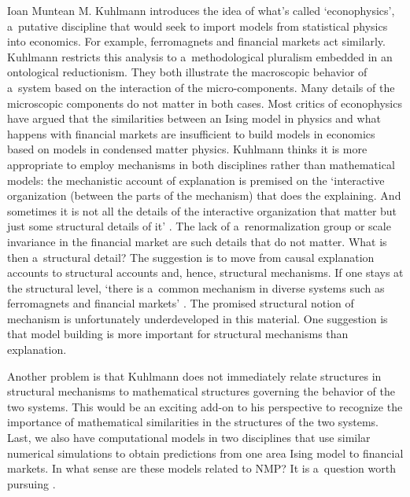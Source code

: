 \begin{recengenv}{Ioan Muntean}
\enlargethispage{1.5\baselineskip}
M. Kuhlmann introduces the idea of what's called ‘econophysics', a~putative discipline that would seek to import models from statistical physics into economics. For example, ferromagnets and financial markets act similarly. Kuhlmann restricts this analysis to a~methodological pluralism embedded in an ontological reductionism. They both illustrate the macroscopic behavior of a~system based on the interaction of the micro-components. Many details of the microscopic components do not matter in both cases. Most critics of econophysics have argued that the similarities between an Ising model in physics and what happens with financial markets are insufficient to build models in economics based on models in condensed matter physics. Kuhlmann thinks it is more appropriate to employ mechanisms in both disciplines rather than mathematical models: the mechanistic account of explanation is premised on the ‘interactive organization (between the parts of the mechanism) that does the explaining. And sometimes it is not all the details of the interactive organization that matter but just some structural details of it'
\parencite*[][p.195]{falkenburg_mechanistic_2019}. %
 The lack of a~renormalization group or scale invariance in the financial market are such details that do not matter. What is then a~structural detail? The suggestion is to move from causal explanation accounts to structural accounts and, hence, structural mechanisms. If one stays at the structural level, ‘there is a~common mechanism in diverse systems such as ferromagnets and financial markets' 
\parencite*[][p.198]{falkenburg_mechanistic_2019}. %
 The promised structural notion of mechanism is unfortunately underdeveloped in this material. One suggestion is that model building is more important for structural mechanisms than explanation.

Another problem is that Kuhlmann does not immediately relate structures in structural mechanisms to mathematical structures governing the behavior of the two systems. This would be an exciting add-on to his perspective to recognize the importance of mathematical similarities in the structures of the two systems. Last, we also have computational models in two disciplines that use similar numerical simulations to obtain predictions from one area Ising model to financial markets. In what sense are these models related to NMP? It is a~question worth pursuing
\parencite[see a~possible connection in][]{humphreys_knowledge_2019}.%



\end{recengenv}
